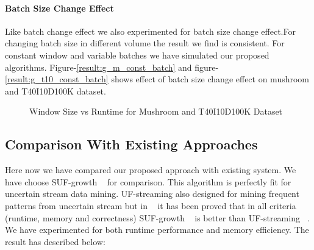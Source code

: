     \paragraph{Batch Size Change Effect}Like batch change effect we also experimented for batch size change effect.For changing batch size in different volume the result we find is consistent. For constant window and variable batches we have simulated our proposed algorithms. Figure-\ref{result:g_m_const_batch} and figure-\ref{result:g_t10_const_batch} shows effect of batch size change effect on mushroom and T40I10D100K dataset.
        \begin{figure}[h]
        \centering
            
            
        \caption{Window Size vs Runtime for Mushroom and T40I10D100K Dataset }
        \label{result:g_m_const_win}
        \end{figure}
\clearpage
\subsection{Comparison With Existing Approaches}
Here now we have compared our proposed approach with existing system. We have choose SUF-growth ~\cite{suf_growth}  for comparison. This algorithm is perfectly fit for uncertain stream data mining. UF-streaming also designed for mining frequent patterns from uncertain stream but in ~\cite{suf_growth} it has been proved that in all criteria (runtime, memory and correctness) SUF-growth ~\cite{suf_growth} is better than UF-streaming ~\cite{suf_growth}. We have experimented for both runtime performance and memory efficiency. The result has described below:
